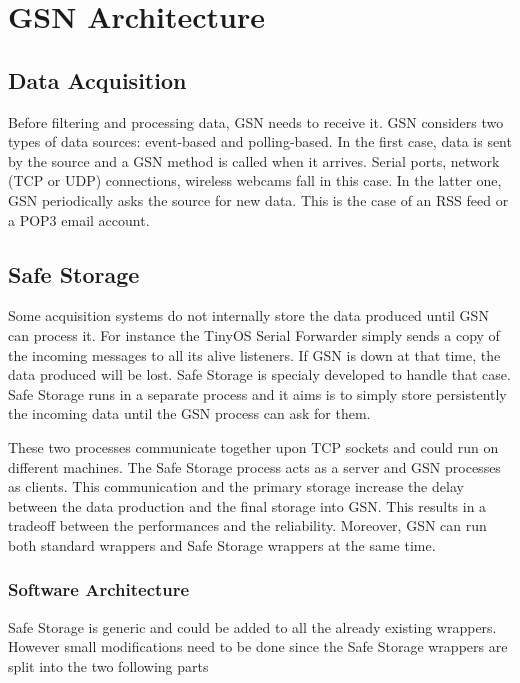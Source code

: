 \graphicspath{{chapters/ch-architecture/figures/}}

\chapter{GSN Architecture}

\section{Data Acquisition}

 Before filtering and processing data, GSN needs to receive it. GSN considers two types of data sources: event-based and polling-based.
 In the first case, data is sent by the source and a GSN method is called when it arrives.
 Serial ports, network (TCP or UDP) connections, wireless webcams fall in this case. In the latter one, GSN periodically asks the 
 source for new data. This is the case of an RSS feed or a POP3 email account.

\section{Safe Storage \label{safe_storage}}

Some acquisition systems do not internally store the data produced until GSN can process it. For instance 
the TinyOS Serial Forwarder simply sends a copy of the incoming messages to all its alive listeners. If GSN is down 
at that time, the data produced will be lost. Safe Storage is specialy developed to handle that case.
Safe Storage runs in a separate process and it aims is to simply store persistently the incoming data until the GSN process can ask for them.

These two processes communicate together upon TCP sockets and could run on different machines. The Safe Storage process acts as 
a server and GSN processes as clients. This communication and the primary storage increase the delay between the data production and the 
final storage into GSN. This results in a tradeoff between the performances and the reliability.
Moreover, GSN can run both standard wrappers and Safe Storage wrappers at the same time.

\subsection{Software Architecture}

Safe Storage is generic and could be added to all the already existing wrappers.
However small modifications need to be done since the Safe Storage wrappers are split into the two following parts

